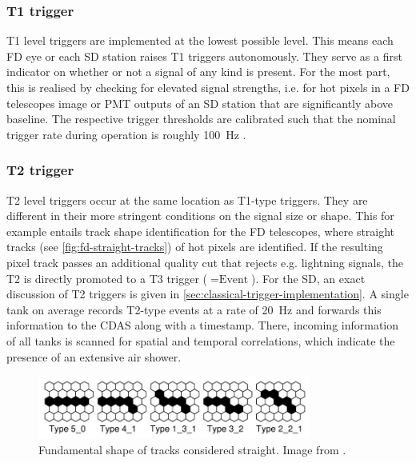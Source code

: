 \subsubsection{T1 trigger}
\label{sssec:t1-trigger}

T1 level triggers are implemented at the lowest possible level. This means each FD eye or each SD station raises T1 triggers autonomously. They serve as a first 
indicator on whether or not a signal of any kind is present. For the most part, this is realised by checking for elevated signal strengths, i.e. for hot pixels 
in a FD telescopes image or PMT outputs of an SD station that are significantly above baseline. The respective trigger thresholds are calibrated such that the 
nominal trigger rate during operation is roughly \SI{100}{\hertz} \cite{FDReconstruction, SDReconstruction}. 

\subsubsection{T2 trigger}
\label{sssec:t2-trigger}

T2 level triggers occur at the same location as T1-type triggers. They are different in their more stringent conditions on the signal size or shape. This for 
example entails track shape identification for the FD telescopes, where straight tracks (see \autoref{fig:fd-straight-tracks}) of hot pixels are identified. 
If the resulting pixel track passes an additional quality cut that rejects e.g. lightning signals, the T2 is directly promoted to a T3 trigger ($=\text{Event}$). 
For the SD, an exact discussion of T2 triggers is given in \autoref{sec:classical-trigger-implementation}. A single tank on average records T2-type events at a 
rate of \SI{20}{\hertz} and forwards this information to the CDAS along with a timestamp. There, incoming information of all tanks is scanned for spatial and 
temporal correlations, which indicate the presence of an extensive air shower. 

\begin{figure}
	\centering
	\includegraphics[width=0.8\textwidth]{./imgs/FD_straight_tracks.png}
	\caption{Fundamental shape of tracks considered straight. Image from \cite{FDReconstruction}.}
	\label{fig:fd-straight-tracks}
\end{figure}

